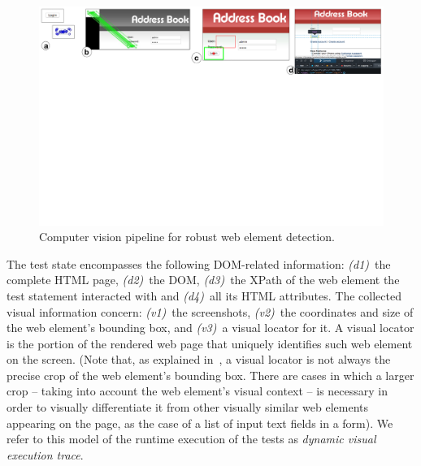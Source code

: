 


\begin{figure}[t]
\centering
\includegraphics[trim={0.3cm 17cm 0.4cm 0.3cm},clip,scale=0.44]{images/cv}
\caption{Computer vision pipeline for robust web element detection.}
\label{fig:cv}
\end{figure}

The test state encompasses the following DOM-related information: \textit{(d1)}~the complete HTML page, \textit{(d2)}~the DOM, \textit{(d3)}~the XPath of the web element the test statement interacted with and \textit{(d4)}~all its HTML attributes. The collected visual information concern: \textit{(v1)}~the screenshots, \textit{(v2)}~the coordinates and size of the web element's bounding box, and \textit{(v3)}~a visual locator for it. A visual locator is the portion of the rendered web page that uniquely identifies such web element on the screen. (Note that, as explained in~\cite{2014-Stocco-SCAM,2015-Leotta-SAC}, a visual locator is not always the precise crop of the web element's bounding box. There are cases in which a larger crop -- taking into account the web element's visual context --  is necessary in order to visually differentiate it from other visually similar web elements appearing on the page, as the case of a list of input text fields in a form).
%
We refer to this model of the runtime execution of the tests as \textit{dynamic visual execution trace}.

